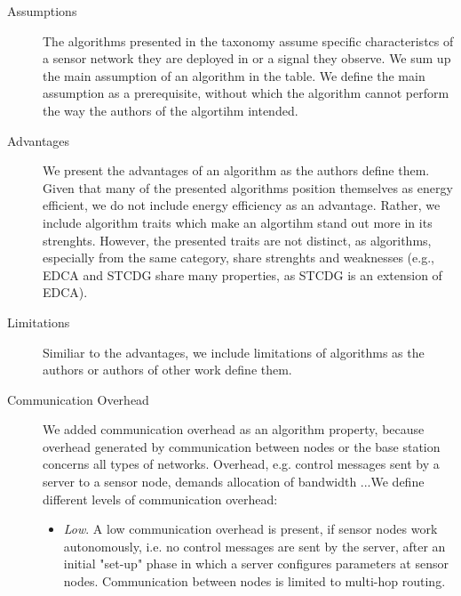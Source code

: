 \begin{description}
    \item[Assumptions]
        The algorithms presented in the taxonomy assume specific characteristcs
        of a sensor network they are deployed in or a signal they observe. We
        sum up the main assumption of an algorithm in the table. We define the
        main assumption as a prerequisite, without which the algorithm cannot
        perform the way the authors of the algortihm intended.
    \item[Advantages]
        We present the advantages of an algorithm as the authors define them.
        Given that many of the presented algorithms position themselves as
        energy efficient, we do not include energy efficiency as an advantage.
        Rather, we include algorithm traits which make an algortihm stand out
        more in its strenghts. However, the presented traits are not distinct,
        as algorithms, especially from the same category, share strenghts and
        weaknesses (e.g., \ac{EDCA} and \ac{STCDG} share many properties, as
        \ac{STCDG} is an extension of \ac{EDCA}).
    \item[Limitations]
        Similiar to the advantages, we include limitations of algorithms as the
        authors or authors of other work define them. 
        
    \item[Communication Overhead]
        We added communication overhead as an algorithm property, because
        overhead generated by communication between nodes or the base station
        concerns all types of networks. Overhead, e.g. control messages sent by
        a server to a sensor node, demands allocation of bandwidth ...We define
        different levels of communication overhead:


        \begin{itemize}
            \item \textit{Low}. A low communication overhead is present, if
            sensor nodes work autonomously, i.e. no control messages are sent
            by the server, after an initial "set-up" phase in which a server
            configures parameters at sensor nodes. Communication between nodes
            is limited to multi-hop routing.


\end{itemize}
\end{description}
